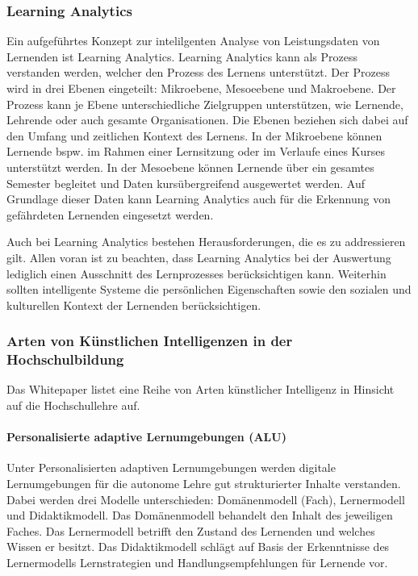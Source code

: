 \subsubsection*{Learning Analytics}
Ein aufgeführtes Konzept zur intelilgenten Analyse von Leistungsdaten von Lernenden ist Learning Analytics. Learning Analytics kann als Prozess verstanden werden, welcher den Prozess des Lernens unterstützt. Der Prozess wird in drei Ebenen eingeteilt: Mikroebene, Mesoeebene und Makroebene. Der Prozess kann je Ebene unterschiedliche Zielgruppen unterstützen, wie Lernende, Lehrende oder auch gesamte Organisationen. Die Ebenen beziehen sich dabei auf den Umfang und zeitlichen Kontext des Lernens. In der Mikroebene können Lernende bspw. im Rahmen einer Lernsitzung oder im Verlaufe eines Kurses unterstützt werden. In der Mesoebene können Lernende über ein gesamtes Semester begleitet und Daten kursübergreifend ausgewertet werden. Auf Grundlage dieser Daten kann Learning Analytics auch für die Erkennung von gefährdeten Lernenden eingesetzt werden.

Auch bei Learning Analytics bestehen Herausforderungen, die es zu addressieren gilt. Allen voran ist zu beachten, dass Learning Analytics bei der Auswertung lediglich einen Ausschnitt des Lernprozesses berücksichtigen kann. Weiterhin sollten intelligente Systeme die persönlichen Eigenschaften sowie den sozialen und kulturellen Kontext der Lernenden berücksichtigen.

\subsubsection*{Arten von Künstlichen Intelligenzen in der Hochschulbildung}
Das Whitepaper listet eine Reihe von Arten künstlicher Intelligenz in Hinsicht auf die Hochschullehre auf.
\paragraph*{Personalisierte adaptive Lernumgebungen (ALU)}
Unter Personalisierten adaptiven Lernumgebungen werden digitale Lernumgebungen für die autonome Lehre gut strukturierter Inhalte verstanden. Dabei werden drei Modelle unterschieden: Domänenmodell (Fach), Lernermodell und Didaktikmodell. Das Domänenmodell behandelt den Inhalt des jeweiligen Faches. Das Lernermodell betrifft den Zustand des Lernenden und welches Wissen er besitzt. Das Didaktikmodell schlägt auf Basis der Erkenntnisse des Lernermodells Lernstrategien und Handlungsempfehlungen für Lernende vor.

